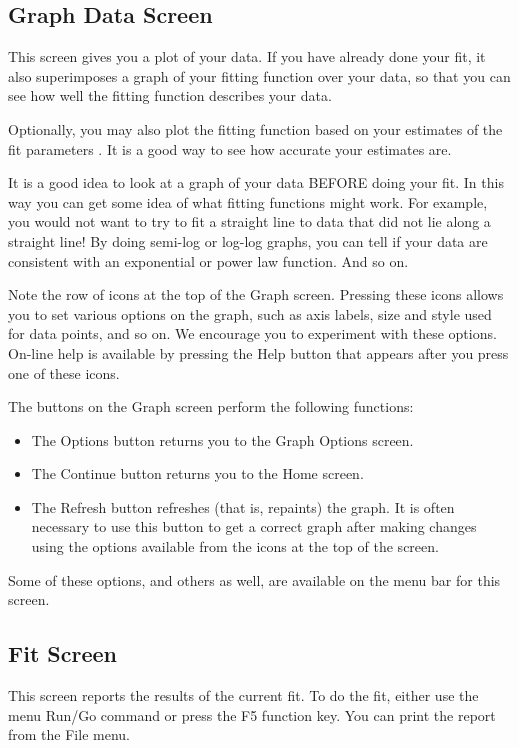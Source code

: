 \subsection*{Graph Data Screen}

This screen gives you a plot of your data.  If you have already done
your fit, it also superimposes a graph of your fitting function over
your data, so that you can see how well the fitting function describes
your data.

Optionally, you may also plot the fitting function based on your
estimates of the fit parameters .  It is a good way to see how
accurate your estimates are.

It is a good idea to look at a graph of your data BEFORE doing your
fit.  In this way you can get some idea of what fitting functions
might work.  For example, you would not want to try to fit a straight
line to data that did not lie along a straight line!  By doing
semi-log or log-log graphs, you can tell if your data are consistent
with an exponential or power law function.  And so on.

Note the row of icons at the top of the Graph screen.  Pressing these
icons allows you to set various options on the graph, such as axis
labels, size and style used for data points, and so on.  We encourage
you to experiment with these options.  On-line help is available by
pressing the Help button that appears after you press one of these
icons.

The buttons on the Graph screen perform the following functions:
\begin{itemize}
\item The Options button returns you to the Graph Options screen.
\item The Continue button returns you to the Home screen.
\item The Refresh button refreshes (that is, repaints) the graph.  It
is often necessary to use this button to get a correct graph after
making changes using the options available from the icons at the top
of the screen.
\end{itemize}
Some of these options, and others as well, are available on the menu
bar for this screen.

\subsection*{Fit Screen}

This screen reports the results of the current fit.  To do the fit,
either use the menu Run/Go command or press the F5 function key.  You
can print the report from the File menu.

